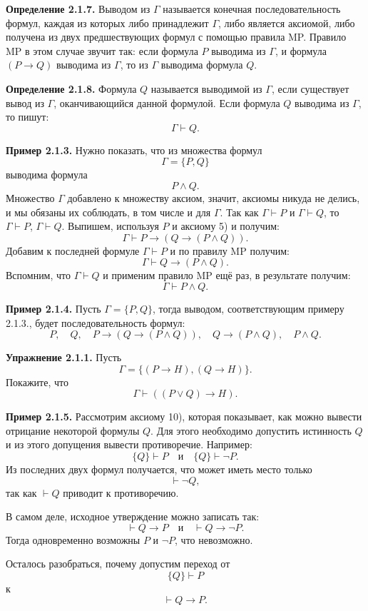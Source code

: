\documentclass[12pt,letterpaper]{article}
\begin{document}
\textbf{Определение 2.1.7.} Выводом из $\Gamma$ называется конечная последовательность формул, каждая из которых либо принадлежит $\Gamma$, либо является аксиомой, либо получена из двух предшествующих формул с помощью правила MP. Правило MP в этом случае звучит так: если формула $P$ выводима из $\Gamma$, и формула $(P \to Q)$ выводима из $\Gamma$, то из $\Gamma$ выводима формула $Q$.

\textbf{Определение 2.1.8.} Формула $Q$ называется выводимой из $\Gamma$, если существует вывод из $\Gamma$, оканчивающийся данной формулой. Если формула $Q$ выводима из $\Gamma$, то пишут:
\[
\Gamma \vdash Q.
\]

\textbf{Пример 2.1.3.} Нужно показать, что из множества формул
\[
\Gamma=\{P,Q\}
\]
выводима формула
\[
P \land Q.
\]
Множество $\Gamma$ добавлено к множеству аксиом, значит, аксиомы никуда не делись, и мы обязаны их соблюдать, в том числе и для $\Gamma$. Так как $\Gamma \vdash P$ и $\Gamma \vdash Q$, то $\Gamma \vdash P$, $\Gamma \vdash Q$. Выпишем, используя $P$ и аксиому 5) и получим:
\[
\Gamma \vdash P \to (Q \to (P \land Q)).
\]
Добавим к последней формуле $\Gamma \vdash P$ и по правилу MP получим:
\[
\Gamma \vdash Q \to (P \land Q).
\]
Вспомним, что $\Gamma \vdash Q$ и применим правило MP ещё раз, в результате получим:
\[
\Gamma \vdash P \land Q.
\]

\textbf{Пример 2.1.4.} Пусть $\Gamma=\{P,Q\}$, тогда выводом, соответствующим примеру 2.1.3., будет последовательность формул:
\[
P,\quad Q,\quad P \to (Q \to (P \land Q)),\quad Q \to (P \land Q),\quad P \land Q.
\]

\textbf{Упражнение 2.1.1.} Пусть
\[
\Gamma=\{(P \to H),(Q \to H)\}.
\]
Покажите, что
\[
\Gamma \vdash ((P \lor Q)\to H).
\]

\textbf{Пример 2.1.5.} Рассмотрим аксиому 10), которая показывает, как можно вывести отрицание некоторой формулы $Q$. Для этого необходимо допустить истинность $Q$ и из этого допущения вывести противоречие. Например:
\[
\{Q\}\vdash P \quad \text{и} \quad \{Q\}\vdash \neg P.
\]
Из последних двух формул получается, что может иметь место только
\[
\vdash \neg Q,
\]
так как $\vdash Q$ приводит к противоречию.

В самом деле, исходное утверждение можно записать так:
\[
\vdash Q \to P \quad \text{и} \quad \vdash Q \to \neg P.
\]
Тогда одновременно возможны $P$ и $\neg P$, что невозможно.

Осталось разобраться, почему допустим переход от
\[
\{Q\}\vdash P
\]
к
\[
\vdash Q \to P.
\]
\end{document}
